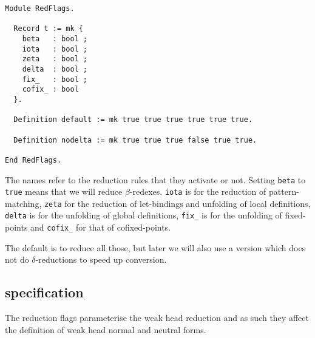 \begin{verbatim}
Module RedFlags.

  Record t := mk {
    beta   : bool ;
    iota   : bool ;
    zeta   : bool ;
    delta  : bool ;
    fix_   : bool ;
    cofix_ : bool
  }.

  Definition default := mk true true true true true true.

  Definition nodelta := mk true true true false true true.

End RedFlags.
\end{verbatim}

The names refer to the reduction rules that they activate or not.
Setting \texttt{beta} to \texttt{true} means that we will
reduce \(\beta\)-redexes.
\texttt{iota} is for the reduction of pattern-matching,
\texttt{zeta} for the reduction of let-bindings and unfolding of local
definitions, \texttt{delta} is for the unfolding of global definitions,
\texttt{fix_} is for the unfolding of fixed-points and
\texttt{cofix_} for that of cofixed-points.

The default is to reduce all those, but later we will also use a version which
does not do \(\delta\)-reductions to speed up conversion.

\subsection{\Coq specification}

The reduction flags parameterise the weak head reduction and as such they
affect the definition of weak head normal and neutral forms.

